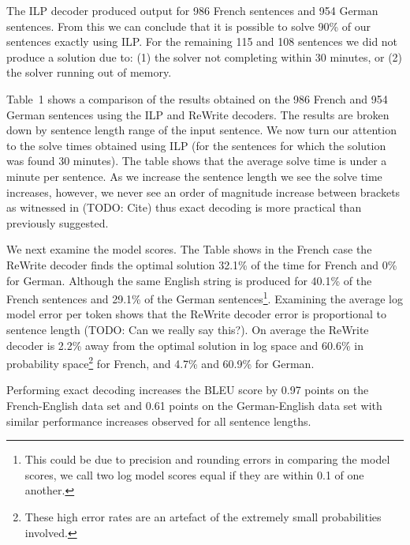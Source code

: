 The ILP decoder produced output for 986 French sentences and 954
German sentences.  From this we can conclude that it is possible to
solve 90\% of our sentences exactly using ILP.  For the remaining 115
and 108 sentences we did not produce a solution due to: (1) the solver
not completing within 30 minutes, or (2) the solver running out of
memory.


Table~1 shows a comparison of the results obtained on the 986 French
and 954 German sentences using the ILP and ReWrite decoders.  The
results are broken down by sentence length range of the input
sentence.  We now turn our attention to the solve times obtained using
ILP (for the sentences for which the solution was found 30 minutes).
The table shows that the average solve time is under a minute per
sentence.  As we increase the sentence length we see the solve time
increases, however, we never see an order of magnitude increase
between brackets as witnessed in (TODO: Cite) thus exact decoding is
more practical than previously suggested.

We next examine the model scores.  The Table shows in the French case
the ReWrite decoder finds the optimal solution 32.1\% of the time for
French and 0\% for German.  Although the same English string is
produced for 40.1\% of the French sentences and 29.1\% of the German
sentences\footnote{This could be due to precision and rounding errors
  in comparing the model scores, we call two log model scores equal if
  they are within 0.1 of one another.}.  Examining the average log
model error per token shows that the ReWrite decoder error is
proportional to sentence length (TODO: Can we really say this?).  On
average the ReWrite decoder is 2.2\% away from the optimal solution in
log space and 60.6\% in probability space\footnote{These high error
  rates are an artefact of the extremely small probabilities
  involved.} for French, and 4.7\% and 60.9\% for German.

Performing exact decoding increases the BLEU score by 0.97 points on
the French-English data set and 0.61 points on the German-English data
set with similar performance increases observed for all sentence
lengths.

